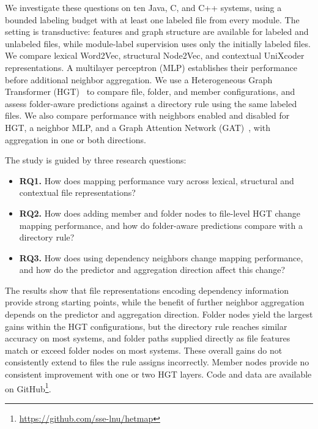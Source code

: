 We investigate these questions on ten Java, C, and C++ systems, using a bounded labeling budget with at least one labeled file from every module. The setting is transductive: features and graph structure are available for labeled and unlabeled files, while module-label supervision uses only the initially labeled files. We compare lexical Word2Vec, structural Node2Vec, and contextual UniXcoder representations. A multilayer perceptron (MLP) establishes their performance before additional neighbor aggregation. We use a Heterogeneous Graph Transformer (HGT)~\cite{hgt} to compare file, folder, and member configurations, and assess folder-aware predictions against a directory rule using the same labeled files. We also compare performance with neighbors enabled and disabled for HGT, a neighbor MLP, and a Graph Attention Network (GAT)~\cite{gat}, with aggregation in one or both directions.

\noindent The study is guided by three research questions:
\begin{itemize}[leftmargin=1em, itemsep=1pt]
    \item \textbf{RQ1.} How does mapping performance vary across lexical, structural and contextual file representations?
    \item \textbf{RQ2.} How does adding member and folder nodes to file-level HGT change mapping performance, and how do folder-aware predictions compare with a directory rule?
    \item \textbf{RQ3.} How does using dependency neighbors change mapping performance, and how do the predictor and aggregation direction affect this change?
\end{itemize}

The results show that file representations encoding dependency information provide strong starting points, while the benefit of further neighbor aggregation depends on the predictor and aggregation direction. Folder nodes yield the largest gains within the HGT configurations, but the directory rule reaches similar accuracy on most systems, and folder paths supplied directly as file features match or exceed folder nodes on most systems. These overall gains do not consistently extend to files the rule assigns incorrectly. Member nodes provide no consistent improvement with one or two HGT layers. Code and data are available on GitHub\footnote{\label{fn:code}\url{https://github.com/sse-lnu/hetmap}}.
